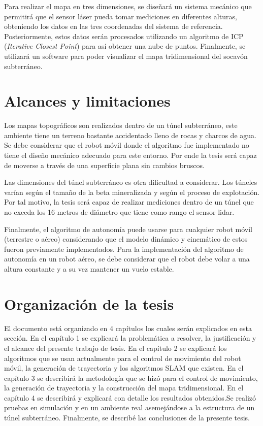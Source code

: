 Para realizar el mapa en tres dimensiones, se diseñar\'a un sistema mec\'anico 
que permitir\'a que el sensor l\'aser pueda tomar mediciones en diferentes 
alturas, obteniendo los datos en las tres coordenadas del sistema de 
referencia. Posteriormente, estos datos serán procesados utilizando un 
algoritmo de ICP (\textit{Iterative Closest Point}) para as\'i obtener una 
nube de puntos. Finalmente, se utilizar\'a un software para poder visualizar 
el mapa tridimensional del socavón subterr\'aneo.

\section{Alcances y limitaciones}

Los mapas topográficos son realizados dentro de un túnel subterráneo, este ambiente 
tiene un terreno bastante accidentado lleno de rocas y charcos de agua. Se debe 
considerar que el robot móvil donde el algoritmo fue implementado no tiene el 
diseño mecánico adecuado para este entorno. Por ende la tesis será capaz de 
moverse a través de una superficie plana sin cambios bruscos.

Las dimensiones del túnel subterráneo es otra dificultad a considerar. Los túneles
varían según el tamaño de la beta mineralizada y según el proceso de explotación. Por 
tal motivo, la tesis será capaz de realizar mediciones dentro de un túnel 
que no exceda los 16 metros de diámetro que tiene como rango el sensor lidar.

Finalmente, el algoritmo de autonom\'ia puede usarse para cualquier robot 
m\'ovil (terrestre o a\'ereo) considerando que el modelo din\'amico y cinem\'atico 
de estos fueron previamente implementados. Para la implementación del algoritmo 
de autonomía en un robot aéreo, se debe considerar que el robot debe volar a una 
altura constante y a su vez mantener un vuelo estable.

\section{Organizaci\'on de la tesis}

El documento está organizado en 4 capítulos los cuales serán explicados en esta
sección. En el capítulo 1 se explicará la problemática a resolver, la justificación y 
el alcance del presente trabajo de tesis. En el capítulo 2 se explicará los algoritmos que 
se usan actualmente para el control de movimiento del robot móvil, la generación de 
trayectoria y  los algoritmos SLAM que existen. En el capítulo 3 se describirá  la metodología
que se hizó para el control de movimiento, la generación de trayectoria y la construcción
del mapa tridimensional. En el capítulo 4 se describirá y explicará con detalle
los resultados obtenidos.Se realizó pruebas en simulación y en un ambiente real asemejándose
a la estructura de un túnel subterráneo. Finalmente, se describé las conclusiones de la 
presente tesis.